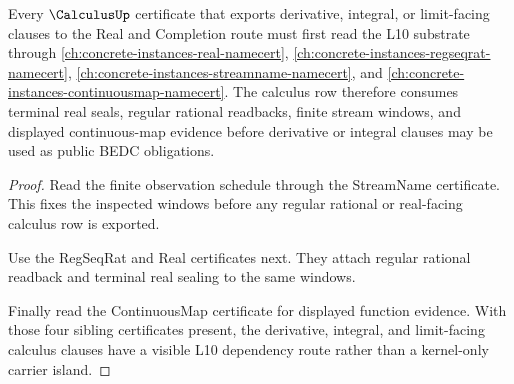 \begin{theorem}
\label{thm:calculus-l10-real-completion-dependency}
Every $\CalculusUp$ certificate that exports derivative, integral, or limit-facing clauses to the Real and Completion route must first read the L10 substrate through \autoref{ch:concrete-instances-real-namecert}, \autoref{ch:concrete-instances-regseqrat-namecert}, \autoref{ch:concrete-instances-streamname-namecert}, and \autoref{ch:concrete-instances-continuousmap-namecert}. The calculus row therefore consumes terminal real seals, regular rational readbacks, finite stream windows, and displayed continuous-map evidence before derivative or integral clauses may be used as public BEDC obligations.
\end{theorem}
\begin{proof}
Read the finite observation schedule through the StreamName certificate. This fixes the inspected windows before any regular rational or real-facing calculus row is exported.

Use the RegSeqRat and Real certificates next. They attach regular rational readback and terminal real sealing to the same windows.

Finally read the ContinuousMap certificate for displayed function evidence. With those four sibling certificates present, the derivative, integral, and limit-facing calculus clauses have a visible L10 dependency route rather than a kernel-only carrier island.
\end{proof}
